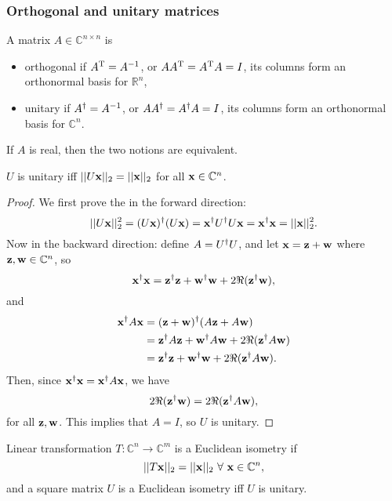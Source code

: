 \documentclass{article}
\begin{document}
\subsubsection{Orthogonal and unitary matrices}
\begin{definition}
    A matrix $A\in\mathbb{C}^{n\times n}$ is
    \begin{itemize}
        \item orthogonal if $A^{\text{T}}=A^{-1}$, or $AA^{\text{T}}=A^{\text{T}} A=I$, its columns form an orthonormal basis for $\mathbb{R}^n$,
        \item unitary if $A^{\dagger}=A^{-1}$, or $AA^{\dagger}=A^{\dagger} A=I$, its columns form an orthonormal basis for $\mathbb{C}^n$.
    \end{itemize}
    If $A$ is real, then the two notions are equivalent.
\end{definition}
\begin{theorem}
    $U$ is unitary iff $||U\bm{\mathrm{x}}||_2=||\bm{\mathrm{x}}||_2$ for all $\bm{\mathrm{x}}\in\mathbb{C}^n$.
\end{theorem}
\begin{proof}
We first prove the in the forward direction:
\begin{equation}
    ||U\bm{\mathrm{x}}||_2^2=(U\bm{\mathrm{x}})^{\dagger}(U\bm{\mathrm{x}})=\bm{\mathrm{x}}^{\dagger} U^{\dagger} U \bm{\mathrm{x}}=\bm{\mathrm{x}}^{\dagger}\bm{\mathrm{x}}=||\bm{\mathrm{x}}||_2^2.
\end{equation}
Now in the backward direction: define $A=U^{\dagger} U$, and let $\bm{\mathrm{x}}=\bm{\mathrm{z}}+\bm{\mathrm{w}}$ where $\bm{\mathrm{z}},\bm{\mathrm{w}}\in\mathbb{C}^n$, so
\begin{equation}
    \bm{\mathrm{x}}^{\dagger}\bm{\mathrm{x}}=\bm{\mathrm{z}}^{\dagger}\bm{\mathrm{z}}+\bm{\mathrm{w}}^{\dagger}\bm{\mathrm{w}}+2\Re(\bm{\mathrm{z}}^{\dagger}\bm{\mathrm{w}}),
\end{equation}
and
\begin{align}
    \bm{\mathrm{x}}^{\dagger} A\bm{\mathrm{x}}&=(\bm{\mathrm{z}}+\bm{\mathrm{w}})^{\dagger}(A\bm{\mathrm{z}}+A\bm{\mathrm{w}})\\
    &=\bm{\mathrm{z}}^{\dagger} A\bm{\mathrm{z}}+\bm{\mathrm{w}}^{\dagger} A\bm{\mathrm{w}}+2\Re(\bm{\mathrm{z}}^{\dagger} A\bm{\mathrm{w}})\\
    &=\bm{\mathrm{z}}^{\dagger}\bm{\mathrm{z}}+\bm{\mathrm{w}}^{\dagger}\bm{\mathrm{w}}+2\Re(\bm{\mathrm{z}}^{\dagger} A\bm{\mathrm{w}}).
\end{align}
Then, since $\bm{\mathrm{x}}^{\dagger}\bm{\mathrm{x}}=\bm{\mathrm{x}}^{\dagger} A\bm{\mathrm{x}}$, we have
\begin{equation}
    2\Re(\bm{\mathrm{z}}^{\dagger}\bm{\mathrm{w}})=2\Re(\bm{\mathrm{z}}^{\dagger} A\bm{\mathrm{w}}),
\end{equation}
for all $\bm{\mathrm{z}},\bm{\mathrm{w}}$. This implies that $A=I$, so $U$ is unitary.
\end{proof}
Linear transformation $T:\mathbb{C}^n\rightarrow\mathbb{C}^m$ is a Euclidean isometry if 
\begin{equation}
    ||T\bvec{x}||_2=||\bvec{x}||_2\ \forall\ \bvec{x}\in\mathbb{C}^n,
\end{equation}
and a square matrix $U$ is a Euclidean isometry iff $U$ is unitary.
\end{document}
